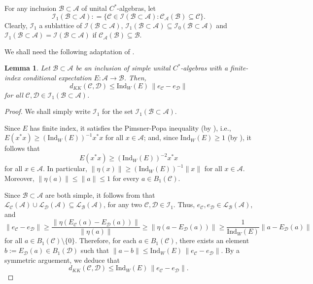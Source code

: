 \documentclass{amsart}
\numberwithin{equation}{section}
\newcommand{\Ind}{\mathrm{Ind}}
\newcommand{\mcal}{\mathcal}
\newcommand{\1}{\mathbf{1}}
\newcommand{\mA}{\mathcal{A}}
\newcommand{\mB}{\mathcal{B}}
\newcommand{\mC}{\mathcal{C}}
\newcommand{\mD}{\mathcal{D}}
\newtheorem{lemma}[theorem]{Lemma}
\begin{document}
 For any inclusion $\mB \subset \mA$ of unital
$C^{*}$-algebras, let
$$
\mcal{I}_1(\mB \subset \mA): = \{\mC \in \mathcal{I}(\mB \subset \mA) : \mC_{\mA}(\mB)  \subseteq \mC \}.
$$ Clearly, $\mcal{I}_1$ a sublattice of $\mcal{I}(\mB \subset \mA)$,
$\mcal{I}_1(\mB \subset \mA) \subseteq \mcal{I}_0(\mB
\subset \mA)$ and $\mcal{I}_1(\mB \subset \mA) = \mcal{I}(\mB \subset
\mA)$ if $\mC_{\mA}(\mB) \subseteq \mB$.


We shall need the following adaptation of \cite[Lemma 3.3]{IW}.
\begin{lemma}\label{C-D-inequality}
Let $\mB \subset \mA$ be an inclusion of simple unital $C^{*}$-algebras with a
finite-index conditional expectation $E: \mA \rightarrow \mB$. Then, 
\begin{equation}\label{C-D-inequality-eqn}
d_{KK}(\mC,\mD)\leq \mathrm{Ind}_W(E)\, \|e_{\mC}-e_{\mD}\|
\end{equation}
for all $\mC,\mD \in \mathcal{I}_{1}(\mB \subset \mA)$.
\end{lemma}


\begin{proof}
  We shall simply write $\mcal{I}_1$ for the set $ \mcal{I}_{1}(\mB
  \subset \mA)$.

  Since $E$ has finite index, it satisfies  the Pimsner-Popa
  inequality   (by \cite[Proposition 2.6.2]{Wat}), i.e.,
  \(
  E(x^{*}x)\geq (\mathrm{Ind}_{W}(E))^{-1}x^{*}x
\)
  for all $x \in \mA$; and, since 
  $\Ind_W(E) \geq 1$ (by \cite[Lemma 2.3.1]{Wat}), it follows that
  \[
  E(x^{*}x)
  \geq (\mathrm{Ind}_{W}(E))^{-2}x^{*}x
  \]
  for all $x \in \mA$.  In particular, $\|\eta(x)\|\geq
  (\mathrm{Ind}_{W}(E))^{-1}\|x\|$ for all $x \in \mA$. Moreover,  $\|\eta(a)\|\leq \|a\|\leq 1$ for every
  $a\in B_{1}(\mC)$.

  Since $\mB \subset \mA$ are both simple,  it follows from  that
  $\mcal{L}_{\mC}(\mA) \cup \mcal{L}_{\mD}(\mA)\subseteq \mcal{L}_{\mB}
  (\mA)$, for any two $\mC, \mD \in
  \mcal{I}_1$. Thus, $e_{\mC}, e_{\mD} \in \mcal{L}_{\mB} (\mA)$, and
 $$ \|e_{\mC}-e_{\mD}\|\geq
\frac{\|\eta(E_{\mC}(a)-E_{\mD}(a))\|}{\|\eta(a)\|}\geq
\|\eta(a-E_{\mD}(a))\|\geq
\frac{1}{\mathrm{Ind}_{W}(E) }\|a-E_{\mD}(a)\|
$$ for all $a \in B_1(\mC)\setminus\{0\}$.  Therefore, for each $a\in
B_{1}(\mC)$, there exists an element $b:=E_{\mD}(a)\in B_{1}(\mD)$ such that
$\|a-b\|\leq \mathrm{Ind}_{W}(E)\, \|e_{\mC}-e_{\mD}\|$. By a symmetric
arguement, we deduce that
\[
d_{KK}(\mC,\mD)\leq
\mathrm{Ind}_W(E)\, \|e_{\mC}-e_{\mD}\|.
\]
\end{proof}
\end{document}
